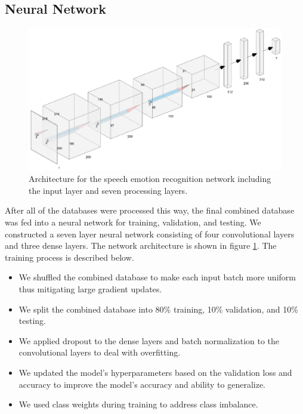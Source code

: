 \documentclass[conference]{IEEEtran}
\begin{document}
\subsection{Neural Network}

\begin{figure}[b!]
	\centering
	\hspace{6mm}
	\includegraphics[width=\textwidth]{neural_network_architecture.png}
	\caption{Architecture for the speech emotion recognition network including the input layer and seven processing layers.}
	\label{fig:neural_network_architecture}
\end{figure}

After all of the databases were processed this way, the final combined database was fed into a neural network for training, validation, and testing. We constructed a seven layer neural network consisting of four convolutional layers and three dense layers. The network architecture is shown in figure \ref{fig:neural_network_architecture}. The training process is described below.
\begin{itemize}
	\item We shuffled the combined database to make each input batch more uniform thus mitigating large gradient updates.
	\item We split the combined database into 80\% training, 10\% validation, and 10\% testing.
	\item We applied dropout \cite{Srivastava2014} to the dense layers and batch normalization \cite{Ioffe2015} to the convolutional layers to deal with overfitting.
	\item We updated the model's hyperparameters based on the validation loss and accuracy to improve the model's accuracy and ability to generalize.
	\item We used class weights during training to address class imbalance.
\end{itemize}
\end{document}
